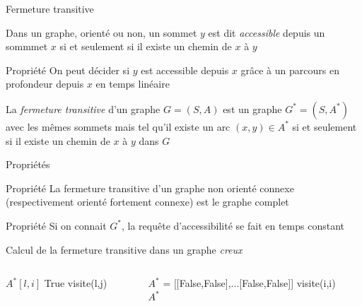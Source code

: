 \begin{frame}{Fermeture transitive}
    \begin{definition}
        Dans un graphe, orienté ou non, un sommet $y$ est dit \emph{accessible} depuis un sommmet $x$ si et seulement si
        il existe un chemin de $x$ à $y$
    \end{definition}

    \begin{block}{Propriété}
        On peut décider si $y$ est accessible depuis $x$ grâce à un parcours en profondeur depuis $x$ en temps linéaire
    \end{block}

    \begin{definition}
        La \emph{fermeture transitive} d'un graphe $G=(S,A)$ est un graphe $G^*=(S,A^*)$ avec les mêmes sommets mais tel qu'il existe un arc $(x,y) \in A^*$ si et seulement si il existe un chemin de $x$ à $y$ dans $G$
    \end{definition}
\end{frame}

\begin{frame}{Propriétés}
\begin{block}{Propriété}
    La fermeture transitive d'un graphe non orienté connexe (respectivement orienté fortement connexe) est le graphe complet
\end{block}

\begin{block}{Propriété}
    Si on connait $G^*$, la requête d'accessibilité se fait en temps constant
\end{block}
\end{frame}


\begin{frame}{Calcul de la fermeture transitive dans un graphe \emph{creux}}
\begin{columns}
\begin{column}{0.5\textwidth}
    \begin{algorithmic}
        \State $A^*[l,i]$ \gets True 
            \State visite(l,j)
        \EndIf
        \EndFor
        \EndFunction
    \end{algorithmic}
\end{column}
\begin{column}{0.5\textwidth}
    \begin{algorithmic}
            \State $A^*$ = [[False,False],...[False,False]]
                \State visite(i,i)
            \EndFor \\
        \Return $A^*$
        \EndFunction
    \end{algorithmic}
\end{column}
\end{columns}
\end{frame}


